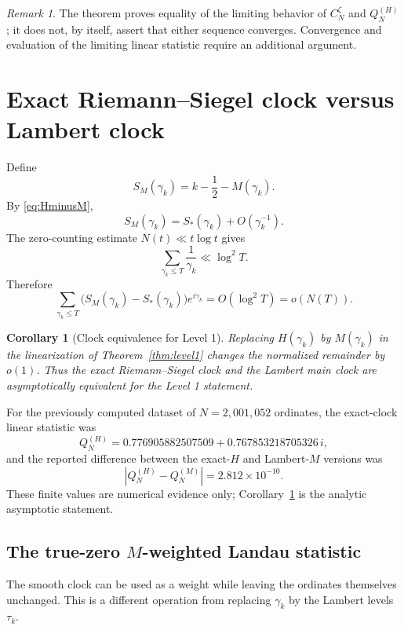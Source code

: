 \documentclass[11pt]{amsart}
\numberwithin{equation}{section}
\newtheorem{corollary}[theorem]{Corollary}
\theoremstyle{definition}
\theoremstyle{remark}
\newtheorem{remark}[theorem]{Remark}
\begin{document}
\begin{remark}
The theorem proves equality of the limiting behavior of $C_N^{\zeta}$ and $Q_N^{(H)}$; it does not, by itself, assert that either sequence converges.  Convergence and evaluation of the limiting linear statistic require an additional argument.
\end{remark}

\section{Exact Riemann--Siegel clock versus Lambert clock}\label{sec:clockequiv}

Define
\[
S_M(\gamma_k)=k-\frac12-M(\gamma_k).
\]
By \eqref{eq:HminusM},
\[
S_M(\gamma_k)=S_*(\gamma_k)+O(\gamma_k^{-1}).
\]
The zero-counting estimate $N(t)\ll t\log t$ gives
\[
\sum_{\gamma_k\le T}\frac1{\gamma_k}\ll\log^2T.
\]
Therefore
\begin{equation}\label{eq:HMphase}
\sum_{\gamma_k\le T}
\bigl(S_M(\gamma_k)-S_*(\gamma_k)\bigr)e^{i\gamma_k}
=O(\log^2T)=o(N(T)).
\end{equation}

\begin{corollary}[Clock equivalence for Level 1]\label{cor:clocklevel1}
Replacing $H(\gamma_k)$ by $M(\gamma_k)$ in the linearization of Theorem~\ref{thm:level1} changes the normalized remainder by $o(1)$.  Thus the exact Riemann--Siegel clock and the Lambert main clock are asymptotically equivalent for the Level 1 statement.
\end{corollary}

For the previously computed dataset of $N=2{,}001{,}052$ ordinates, the exact-clock linear statistic was
\[
Q_N^{(H)}
=0.776905882507509+0.767853218705326\,i,
\]
and the reported difference between the exact-$H$ and Lambert-$M$ versions was
\[
|Q_N^{(H)}-Q_N^{(M)}|=2.812\times10^{-10}.
\]
These finite values are numerical evidence only; Corollary~\ref{cor:clocklevel1} is the analytic asymptotic statement.

\subsection{The true-zero $M$-weighted Landau statistic}\label{subsec:true_zero_landau}

The smooth clock can be used as a weight while leaving the ordinates themselves unchanged.  This is a different operation from replacing $\gamma_k$ by the Lambert levels $\tau_k$.
\end{document}

